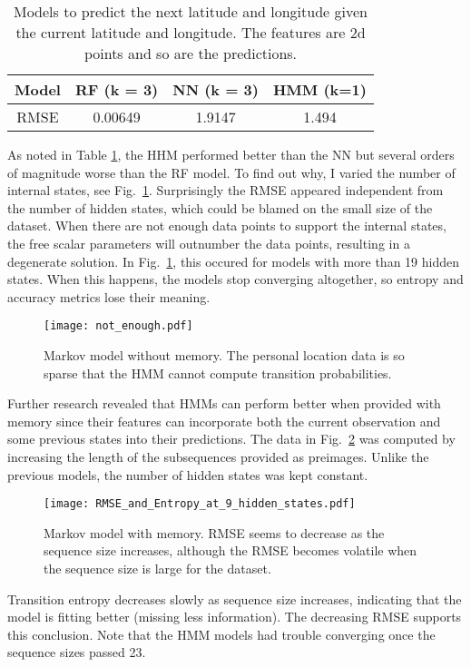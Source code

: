 \documentclass[11pt]{amsart}
\begin{document}
\begin{table}[h!]
\centering
\begin{tabular}{|c|c|c|c|}
\hline
Model & RF (k = 3) & NN (k = 3) & HMM (k=1) \\ \hline
RMSE & 0.00649 & 1.9147 & 1.494\\ \hline
\end{tabular}
\caption{Models to predict the next latitude and longitude given the current latitude and longitude.
The features are 2d points and so are the predictions.}
\label{table2}
\end{table}

As noted in Table \ref{table2}, the HHM performed better than the NN but several orders of magnitude worse than the RF model.
To find out why, I varied the number of internal states, see Fig.~\ref{fig:rmse_entropy}.
Surprisingly the RMSE appeared independent from the number of hidden states, which could be blamed on the small size of the dataset.
When there are not enough data points to support the internal states, the free scalar parameters will outnumber the data points, resulting in a degenerate solution.
In Fig.~\ref{fig:rmse_entropy}, this occured for models with more than 19 hidden states.
When this happens, the models stop converging altogether, so entropy and accuracy metrics lose their meaning.

\begin{figure}[h!]
    \centering
    \texttt{[image: not\_enough.pdf]} %
    \caption{Markov model without memory.
    The personal location data is so sparse that the HMM cannot compute transition probabilities.}
    \label{fig:rmse_entropy}
\end{figure}

Further research revealed that HMMs can perform better when provided with memory since their features can incorporate both the current observation and some previous states into their predictions.
The data in Fig.~\ref{fig:hmm_memory} was computed by increasing the length of the subsequences provided as preimages.
Unlike the previous models, the number of hidden states was kept constant.
\begin{figure}[b]
    \centering
    \texttt{[image: RMSE\_and\_Entropy\_at\_9\_hidden\_states.pdf]} %
    \caption{Markov model with memory.
    RMSE seems to decrease as the sequence size increases, although the RMSE becomes volatile when the sequence size is large for the dataset.}
    \label{fig:hmm_memory}
\end{figure}
Transition entropy decreases slowly as sequence size increases, indicating that the model is fitting better (missing less information).
The decreasing RMSE supports this conclusion.
Note that the HMM models had trouble converging once the sequence sizes passed 23.
\end{document}
